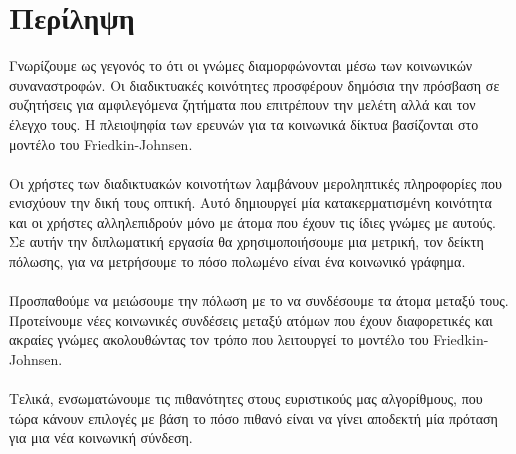 \chapter*{Περίληψη}

\noindent Γνωρίζουμε ως γεγονός το ότι οι γνώμες διαμορφώνονται μέσω των κοινωνικών συναναστροφών. Οι διαδικτυακές κοινότητες προσφέρουν δημόσια την πρόσβαση σε συζητήσεις για αμφιλεγόμενα ζητήματα που επιτρέπουν την μελέτη αλλά και τον έλεγχο τους. Η πλειοψηφία των ερευνών για τα κοινωνικά δίκτυα βασίζονται στο μοντέλο του Friedkin-Johnsen.
\\
\\
Οι χρήστες των διαδικτυακών κοινοτήτων λαμβάνουν μεροληπτικές πληροφορίες που ενισχύουν την δική τους οπτική. Αυτό δημιουργεί μία κατακερματισμένη κοινότητα και οι χρήστες αλληλεπιδρούν μόνο με άτομα που έχουν τις ίδιες γνώμες με αυτούς. Σε αυτήν την διπλωματική εργασία θα χρησιμοποιήσουμε μια μετρική, τον δείκτη πόλωσης, για να μετρήσουμε το πόσο πολωμένο είναι ένα κοινωνικό γράφημα.
\\
\\
Προσπαθούμε να μειώσουμε την πόλωση με το να συνδέσουμε τα άτομα μεταξύ τους. Προτείνουμε νέες κοινωνικές συνδέσεις μεταξύ ατόμων που έχουν διαφορετικές και ακραίες γνώμες ακολουθώντας τον τρόπο που λειτουργεί το μοντέλο του Friedkin-Johnsen.
\\
\\
Τελικά, ενσωματώνουμε τις πιθανότητες στους ευριστικούς μας αλγορίθμους, που τώρα κάνουν επιλογές με βάση το πόσο πιθανό είναι να γίνει αποδεκτή μία πρόταση για μια νέα κοινωνική σύνδεση.

\bigskip
